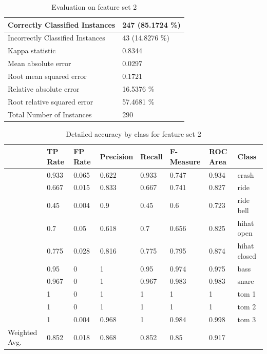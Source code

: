 \begin{table}[bp]
  \caption{Evaluation on feature set 2}
  \label{tab:WekaEval2} 
	\centering
	\footnotesize
	\begin{tabular}[c]{|l|l|}
	  \hline
		Correctly Classified Instances   &      247 (85.1724 \%) \\
	  \hline
Incorrectly Classified Instances    &    43 (14.8276 \%) \\
	  \hline
Kappa statistic      &                    0.8344 \\
	  \hline
Mean absolute error    &                  0.0297 \\
	  \hline
Root mean squared error  &                0.1721 \\
	  \hline
Relative absolute error  &               16.5376 \% \\
	  \hline
Root relative squared error   &          57.4681 \% \\
	  \hline
Total Number of Instances    &          290   \\
	  \hline
	\end{tabular}
\end{table}

\begin{table}[bp]
  \caption{Detailed accuracy by class for feature set 2}
  \label{tab:wekaAcc2} 
	\centering
	\footnotesize
	\begin{tabular}[c]{|l|l|l|l|l|l|l|l|}
	  \hline
		   &            TP Rate &  FP Rate & Precision &  Recall  &F-Measure &  ROC Area & Class \\
	  \hline
      &           0.933  &   0.065   &   0.622  &   0.933  &   0.747   &   0.934   & crash \\
	  \hline
        &         0.667  &   0.015    &  0.833  &   0.667   &  0.741   &   0.827   & ride \\
	  \hline
        &         0.45   &   0.004   &   0.9    &   0.45   &   0.6    &    0.723  &  ride bell \\
	  \hline
        &         0.7    &   0.05   &    0.618  &   0.7    &   0.656    &  0.825 &   hihat open \\
	  \hline
       &          0.775  &   0.028  &    0.816  &   0.775  &   0.795    &  0.874 &   hihat closed \\
	  \hline
       &          0.95   &   0    &      1   &      0.95   &   0.974    &  0.975  &  bass \\
	  \hline
       &          0.967  &   0    &      1    &     0.967   &  0.983    &  0.983 &   snare \\
	  \hline
       &          1    &     0   &       1     &    1    &     1    &      1     &   tom 1 \\
	  \hline
       &          1   &     0    &      1      &   1    &     1    &      1    &    tom 2 \\
	  \hline
       &          1  &       0.004    &  0.968   & 1   &      0.984    &  0.998   & tom 3 \\
	  \hline
Weighted Avg. &   0.852   &  0.018  &    0.868  &   0.852   &  0.85  &     0.917  & \\
	  \hline
	\end{tabular}
\end{table}

